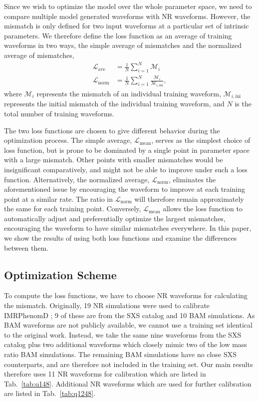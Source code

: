 \documentclass[twocolumn]{aastex631}
\begin{document}
Since we wish to optimize the model over the whole parameter space,
we need to compare multiple model generated waveforms with NR waveforms.
However, the mismatch is only defined for two input waveforms at a particular set of intrinsic parameters.
We therefore define the loss function as an average of training waveforms in two ways,
the simple average of mismatches and the normalized average of mismatches,  
\begin{align}\label{eqn:loss}
	\mathcal{L}_{\mathrm{ave}}&=\frac{1}{N}\sum_{i=1}^N\mathcal{M}_i \\
	\mathcal{L}_{\mathrm{norm}}&=\frac{1}{N}\sum_{i=1}^N\frac{\mathcal{M}_i}{\mathcal{M}_{i,\mathrm{ini}}},
\end{align}	
where $\mathcal{M}_i$ represents the mismatch of an individual training waveform,
$\mathcal{M}_{i,\mathrm{ini}}$ represents the initial mismatch of the individual
training waveform, and $N$ is the total number of training waveforms.

The two loss functions are chosen to give different 
behavior during the optimization process.
The simple average, $\mathcal{L}_{\mathrm{mean}}$, serves as the simplest choice of loss function,
but is prone to be dominated by a single point in parameter space with a large mismatch.
Other points with smaller mismatches would be insignificant comparatively, and might not be able 
to improve under such a loss function.
Alternatively, the normalized average, $\mathcal{L}_{\mathrm{norm}}$, eliminates the aforementioned issue
by encouraging the waveform to improve at each training point at a similar rate.
The ratio in $\mathcal{L}_{\mathrm{norm}}$ will therefore remain approximately the same for each training point.
Conversely, $\mathcal{L}_{\mathrm{mean}}$ allows the loss function to automatically adjust
and preferentially optimize the largest mismatches, encouraging the waveform to have similar mismatches everywhere.
In this paper, we show the results of using both loss functions 
and examine the differences between them. 

\subsection{Optimization Scheme} \label{subsec:optimization}

To compute the loss functions, we have to choose NR waveforms for calculating the mismatch.
Originally, 19 NR simulations were used to calibrate IMRPhenomD \citep{khan2016frequency}; 9 of these 
are from the SXS catalog \citep{boyle2019sxs} and 10 BAM simulations. 
As BAM waveforms are not publicly available, we cannot use a training set identical to the original work.
Instead, we take the same nine waveforms from the SXS catalog plus two additional waveforms which closely mimic
two of the low mass ratio BAM simulations. 
The remaining BAM simulations have no close SXS counterparts, and are therefore not included in the training set.
Our main results therefore uses 11 NR waveforms for calibration which are listed in Tab.~\ref{tab:q148}.
Additional NR waveforms which are used for further calibration are listed in Tab.~\ref{tab:q1248}.  
\end{document}
